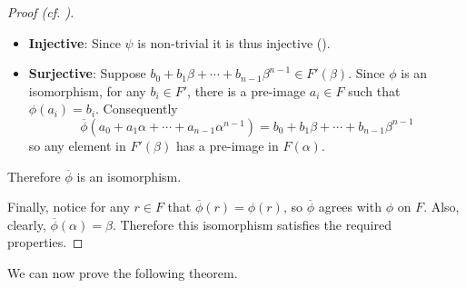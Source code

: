 \begin{proof}[Proof (cf. {\cite[Lemma 21.32]{judson_beezer_2022}})]
\begin{itemize}
        \item \textbf{Injective}: Since $\psi$ is non-trivial it is thus injective ().

        \item \textbf{Surjective}: Suppose $b_0 + b_1\beta + \cdots + b_{n-1}\beta^{n-1} \in F'(\beta)$. Since $\phi$ is an isomorphism, for any $b_i \in F'$, there is a pre-image $a_i \in F$ such that $\phi(a_i) = b_i$. Consequently
        \[
            \overline{\phi}\left(a_0 + a_1\alpha + \cdots + a_{n-1}\alpha^{n-1}\right) = b_0 + b_1\beta + \cdots + b_{n-1}\beta^{n-1}
        \]
        so any element in $F'(\beta)$ has a pre-image in $F(\alpha)$.
    \end{itemize}
    Therefore $\overline{\phi}$ is an isomorphism.

    Finally, notice for any $r \in F$ that $\overline{\phi}(r) = \phi(r)$, so $\overline{\phi}$ agrees with $\phi$ on $F$. Also, clearly, $\overline{\phi}(\alpha) = \beta$. Therefore this isomorphism satisfies the required properties.
\end{proof}

We can now prove the following theorem.

